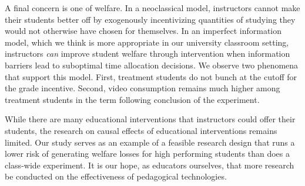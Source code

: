 \documentclass[12pt]{article}
\begin{document}
A final concern is one of welfare. In a neoclassical model, instructors cannot make their students better off by exogenously incentivizing quantities of studying they would not otherwise have chosen for themselves. In an imperfect information model, which we think is more appropriate in our university classroom setting, instructors \textit{can} improve student welfare through intervention when information barriers lead to suboptimal time allocation decisions. We observe two phenomena that support this model. First, treatment students do not bunch at the cutoff for the grade incentive. Second, video consumption remains much higher among treatment students in the term following conclusion of the experiment.

While there are many educational interventions that instructors could offer their students, the research on causal effects of educational interventions remains limited. Our study serves as an example of a feasible research design that runs a lower risk of generating welfare losses for high performing students than does a class-wide experiment. It is our hope, as educators ourselves, that more research be conducted on the effectiveness of pedagogical technologies.

\printbibliography


\clearpage


\clearpage


\clearpage


\clearpage


\clearpage


\clearpage


\end{document}
